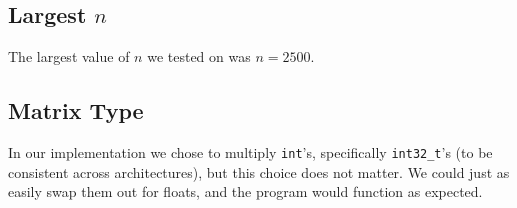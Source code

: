 \documentclass[solution, letterpaper]{cs121}
\begin{document}
\subsection*{Largest $n$}
The largest value of $n$ we tested on was $n = 2500$. 

\subsection*{Matrix Type}
In our implementation we chose to multiply {\tt int}'s, specifically {\tt int32\_t}'s (to be consistent across architectures), but this choice does not matter. We could just as easily swap them out for floats, and the program would function as expected.
\end{document}
